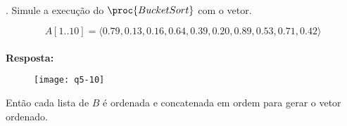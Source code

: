 \\[12pt]
. Simule a execução do $\proc{BucketSort}$ com o vetor.

\[ A[1..10] = \langle 0.79, 0.13, 0.16, 0.64, 0.39, 0.20, 0.89, 0.53, 0.71, 0.42 \rangle \]
\\[6pt]
\textbf{Resposta:}
\begin{figure}[h]
  \centering
  \texttt{[image: q5-10]}
\end{figure}

\noindent Então cada lista de $B$ é ordenada e concatenada em ordem para gerar o vetor ordenado.